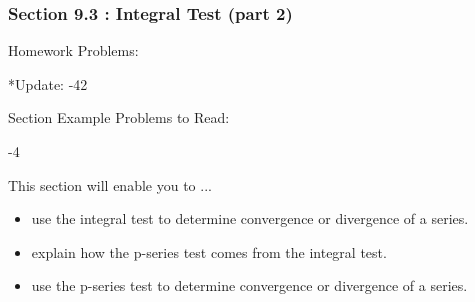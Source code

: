 %
%

\begin{frame}
\frametitle{\Large {\color[rgb]{0.02,0.20,1.0} Section 9.3 : Integral Test (part 2)}}
\vspace{0.8cm}
\scriptsize
\begin{block}{Homework Problems:}

\vspace{0.2cm}
\centering
*Update: -42
	
\end{block}
\vspace{0.5cm}

\begin{block}{Section Example Problems to Read:}

\vspace{0.2cm}
-4
	
\end{block}
\vspace{0.2cm}

\begin{block}{This section will enable you to ...}
\begin{itemize}
	\item[...] use the integral test to determine convergence or divergence of a series.
	\item[...] explain how the p-series test comes from the integral test.  
	\item[...] use the p-series test to determine convergence or divergence of a series.
\end{itemize}
\end{block}
\vspace{3.0cm}
\end{frame}

